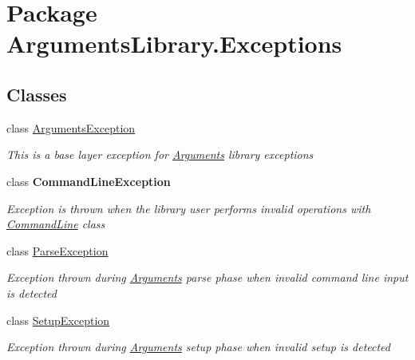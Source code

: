 \hypertarget{namespace_arguments_library_1_1_exceptions}{\section{Package Arguments\+Library.\+Exceptions}
\label{namespace_arguments_library_1_1_exceptions}
}
\subsection*{Classes}
\begin{DoxyCompactItemize}
\item 
class \hyperlink{class_arguments_library_1_1_exceptions_1_1_arguments_exception}{Arguments\+Exception}
\begin{DoxyCompactList}\small\item\em This is a base layer exception for \hyperlink{class_arguments_library_1_1_arguments}{Arguments} library exceptions \end{DoxyCompactList}\item 
class {\bfseries Command\+Line\+Exception}
\begin{DoxyCompactList}\small\item\em Exception is thrown when the library user performs invalid operations with \hyperlink{class_arguments_library_1_1_command_line}{Command\+Line} class \end{DoxyCompactList}\item 
class \hyperlink{class_arguments_library_1_1_exceptions_1_1_parse_exception}{Parse\+Exception}
\begin{DoxyCompactList}\small\item\em Exception thrown during \hyperlink{class_arguments_library_1_1_arguments}{Arguments} parse phase when invalid command line input is detected \end{DoxyCompactList}\item 
class \hyperlink{class_arguments_library_1_1_exceptions_1_1_setup_exception}{Setup\+Exception}
\begin{DoxyCompactList}\small\item\em Exception thrown during \hyperlink{class_arguments_library_1_1_arguments}{Arguments} setup phase when invalid setup is detected \end{DoxyCompactList}\end{DoxyCompactItemize}
